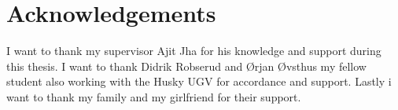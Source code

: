 \chapter*{Acknowledgements}
I want to thank my supervisor Ajit Jha for his knowledge and support during this thesis. I want to thank Didrik Robserud and Ørjan Øvsthus my fellow student also working with the Husky UGV for accordance and support. Lastly i want to thank my family and my girlfriend for their support.  